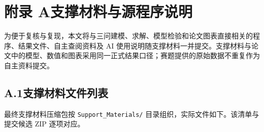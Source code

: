 \section*{附录 A\quad 支撑材料与源程序说明}
\label{sec:appendix-support}

为便于复核与复现，本文将与三问建模、求解、模型检验和论文图表直接相关的程序、结果文件、自主查阅资料及 AI 使用说明随支撑材料一并提交。支撑材料与论文中的模型、数值和图表采用同一正式结果口径；赛题提供的原始数据不重复作为自主资料提交。

\subsection*{A.1\quad 支撑材料文件列表}

最终支撑材料压缩包按 \texttt{Support\_Materials/} 目录组织，实际文件如下。该清单与提交候选 ZIP 逐项对应。

